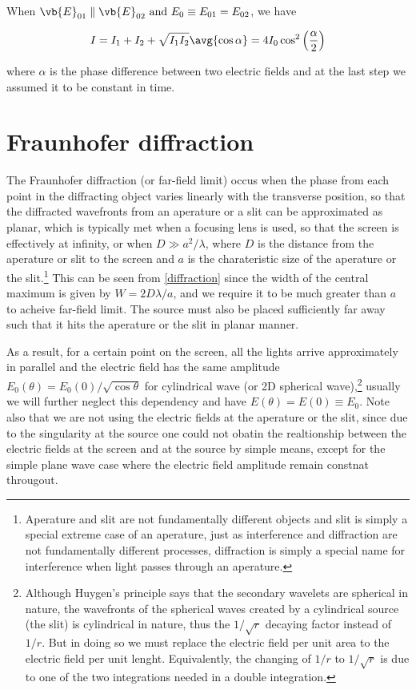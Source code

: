 \documentclass[english,a4paper,12pt]{report}
\begin{document}
When \(\vb{E} _{01} \parallel \vb{E} _{02} \text { and } E_0  \equiv E_{01} = E_{02}    \), we have

\begin{equation}
    I = I_1 + I_2 + \sqrt{I_1 I_2 }  \avg{\cos \alpha} = 4I_0 \cos ^2 \left( \frac{\alpha }{2}  \right) 
\end{equation}

where \(\alpha \) is the phase difference between two electric fields and at the last step we assumed it to be constant in time.

\section{Fraunhofer diffraction}

The Fraunhofer diffraction (or far-field limit) occus when the phase from each point in the diffracting object varies linearly with the transverse position, so that the diffracted wavefronts from an aperature or a slit can be approximated as planar, which is typically met when a focusing lens is used, so that the screen is effectively at infinity, or when \(D \gg a^2/\lambda \), where \(D\) is the distance from the aperature or slit to the screen and \(a\) is the charateristic size of the aperature or the slit.\footnote{Aperature and slit are not fundamentally different objects and slit is simply a special extreme case of an aperature, just as interference and diffraction are not fundamentally different processes, diffraction is simply a special name for interference when light passes through an aperature.} This can be seen from \cref{diffraction} since the width of the central maximum is given by \(W = 2D\lambda /a\), and we require it to be much greater than \(a\) to acheive far-field limit. The source must also be placed sufficiently far away such that it hits the aperature or the slit in planar manner.

As a result, for a certain point on the screen, all the lights arrive approximately in parallel and the electric field has the same amplitude \(E_0 (\theta ) = E_0 (0) / \sqrt{\cos \theta } \) for cylindrical wave (or 2D spherical wave),\footnote{Although Huygen's principle says that the secondary wavelets are spherical in nature, the wavefronts of the spherical waves created by a cylindrical source (the slit) is cylindrical in nature, thus the \(1 /\sqrt{r} \) decaying factor instead of \(1/r\). But in doing so we must replace the electric field per unit area to the electric field per unit lenght. Equivalently, the changing of \(1/r\) to \(1/\sqrt{r} \) is due to one of the two integrations needed in a double integration.} usually we will further neglect this dependency and have \(E(\theta ) = E(0) \equiv  E_0 \). Note also that we are not using the electric fields at the aperature or the slit, since due to the singularity at the source one could not obatin the realtionship between the electric fields at the screen and at the source by simple means, except for the simple plane wave case where the electric field amplitude remain constnat througout.
\end{document}
